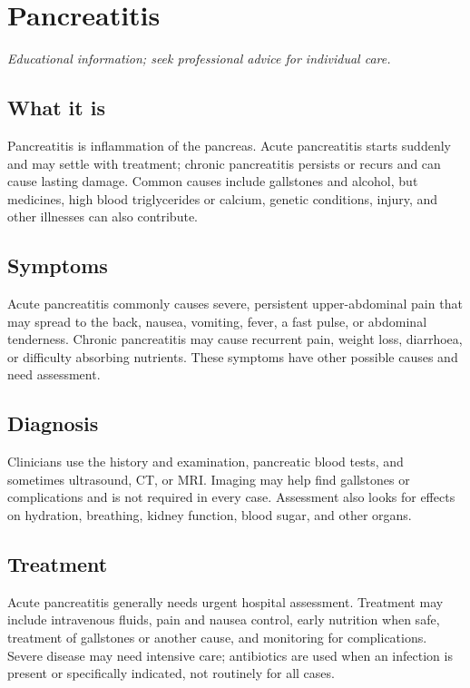 \chapter{Pancreatitis}

\medskip
\noindent\textit{Educational information; seek professional advice for individual care.}

\section*{What it is}
Pancreatitis is inflammation of the pancreas. Acute pancreatitis starts suddenly and may settle with treatment; chronic pancreatitis persists or recurs and can cause lasting damage. Common causes include gallstones and alcohol, but medicines, high blood triglycerides or calcium, genetic conditions, injury, and other illnesses can also contribute.

\section*{Symptoms}
Acute pancreatitis commonly causes severe, persistent upper-abdominal pain that may spread to the back, nausea, vomiting, fever, a fast pulse, or abdominal tenderness. Chronic pancreatitis may cause recurrent pain, weight loss, diarrhoea, or difficulty absorbing nutrients. These symptoms have other possible causes and need assessment.

\section*{Diagnosis}
Clinicians use the history and examination, pancreatic blood tests, and sometimes ultrasound, CT, or MRI. Imaging may help find gallstones or complications and is not required in every case. Assessment also looks for effects on hydration, breathing, kidney function, blood sugar, and other organs.

\section*{Treatment}
Acute pancreatitis generally needs urgent hospital assessment. Treatment may include intravenous fluids, pain and nausea control, early nutrition when safe, treatment of gallstones or another cause, and monitoring for complications. Severe disease may need intensive care; antibiotics are used when an infection is present or specifically indicated, not routinely for all cases.

